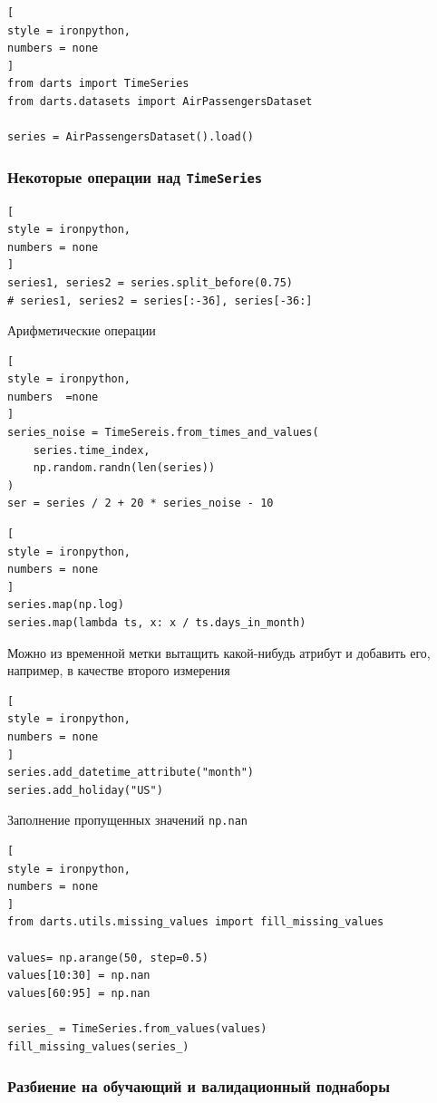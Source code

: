 \documentclass[%
	11pt,
	a4paper,
	utf8,
		]{article}
\begin{document}
\begin{lstlisting}[
style = ironpython,
numbers = none
]
from darts import TimeSeries
from darts.datasets import AirPassengersDataset

series = AirPassengersDataset().load()
\end{lstlisting}

\subsubsection{Некоторые операции над \texttt{TimeSeries}}

\begin{lstlisting}[
style = ironpython,
numbers = none
]
series1, series2 = series.split_before(0.75)
# series1, series2 = series[:-36], series[-36:]
\end{lstlisting}

Арифметические операции
\begin{lstlisting}[
style = ironpython,
numbers  =none
]
series_noise = TimeSereis.from_times_and_values(
    series.time_index,
    np.random.randn(len(series))
)
ser = series / 2 + 20 * series_noise - 10
\end{lstlisting}

\begin{lstlisting}[
style = ironpython,
numbers = none
]
series.map(np.log)
series.map(lambda ts, x: x / ts.days_in_month)
\end{lstlisting}

Можно из временной метки вытащить какой-нибудь атрибут и добавить его, например, в качестве второго измерения
\begin{lstlisting}[
style = ironpython,
numbers = none
]
series.add_datetime_attribute("month")
series.add_holiday("US")
\end{lstlisting}

Заполнение пропущенных значений \verb|np.nan|
\begin{lstlisting}[
style = ironpython,
numbers = none
]
from darts.utils.missing_values import fill_missing_values

values= np.arange(50, step=0.5)
values[10:30] = np.nan
values[60:95] = np.nan

series_ = TimeSeries.from_values(values)
fill_missing_values(series_)
\end{lstlisting}

\subsubsection{Разбиение на обучающий и валидационный поднаборы}
\end{document}
